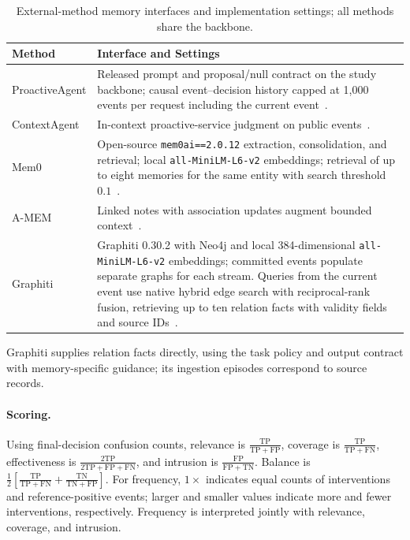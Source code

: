 \begin{table}[t]
\centering
\caption{External-method memory interfaces and implementation settings; all methods share the backbone.}
\label{tab:baseline_interfaces}
\begin{tabular}{@{}p{}p{}@{}}
\toprule
\textbf{Method} & \textbf{Interface and Settings} \\
\midrule
ProactiveAgent & Released prompt and proposal/null contract on the study backbone; causal event--decision history capped at 1,000 events per request including the current event~\citep{lu2025proactiveagent,thunlp2026proactiveagentrepo}. \\
\addlinespace[3pt]
ContextAgent & In-context proactive-service judgment on public events~\citep{yang2025contextagent}. \\
\addlinespace[3pt]
Mem0 & Open-source \texttt{mem0ai==2.0.12} extraction, consolidation, and retrieval; local \texttt{all-MiniLM-L6-v2} embeddings; retrieval of up to eight memories for the same entity with search threshold $0.1$~\citep{chhikara2025mem0,mem0ai2026mem0v2012}. \\
\addlinespace[3pt]
A-MEM & Linked notes with association updates augment bounded context~\citep{xu2025amem}. \\
\addlinespace[3pt]
Graphiti & Graphiti 0.30.2 with Neo4j and local 384-dimensional \texttt{all-MiniLM-L6-v2} embeddings; committed events populate separate graphs for each stream. Queries from the current event use native hybrid edge search with reciprocal-rank fusion, retrieving up to ten relation facts with validity fields and source IDs~\citep{zep2026graphiti}. \\
\bottomrule
\end{tabular}
\end{table}

Graphiti supplies relation facts directly, using the task policy and output contract with memory-specific guidance; its ingestion episodes correspond to source records.

\paragraph{Scoring.}
Using final-decision confusion counts, relevance is $\tfrac{\mathrm{TP}}{\mathrm{TP}+\mathrm{FP}}$, coverage is $\tfrac{\mathrm{TP}}{\mathrm{TP}+\mathrm{FN}}$, effectiveness is $\tfrac{2\mathrm{TP}}{2\mathrm{TP}+\mathrm{FP}+\mathrm{FN}}$, and intrusion is $\tfrac{\mathrm{FP}}{\mathrm{FP}+\mathrm{TN}}$.
Balance is $\tfrac{1}{2}[\tfrac{\mathrm{TP}}{\mathrm{TP}+\mathrm{FN}}+\tfrac{\mathrm{TN}}{\mathrm{TN}+\mathrm{FP}}]$.
For frequency, $1\times$ indicates equal counts of interventions and reference-positive events; larger and smaller values indicate more and fewer interventions, respectively.
Frequency is interpreted jointly with relevance, coverage, and intrusion.

